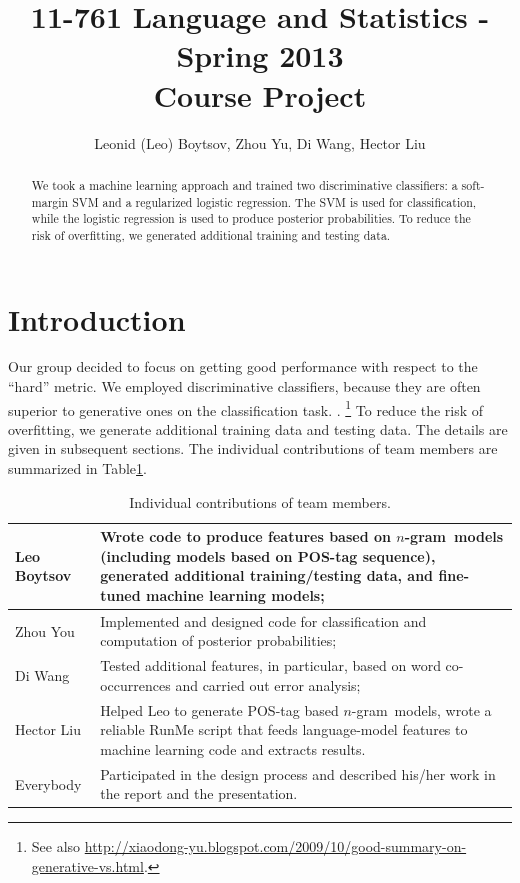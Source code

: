 \documentclass[11pt]{article}
\newcommand{\ngram}{\mbox{$n$-gram }}
\newcommand{\leocomment}[1]{\todo[color=red!40,caption={Leo's comment}]{#1}}
\begin{document}
\title{11-761 Language and Statistics - Spring 2013\\
Course Project}
\author{Leonid (Leo) Boytsov, Zhou Yu, Di Wang, Hector Liu}
\date{}
\maketitle

\begin{abstract}
We took a machine learning approach and trained two discriminative classifiers: 
a soft-margin SVM and a regularized logistic regression.
The SVM is used for classification, while the logistic regression is used to produce posterior probabilities.
To reduce the risk of overfitting, we generated additional training and testing data.
\end{abstract}


\section{Introduction}
Our group decided to focus on getting good performance with respect to the ``hard'' metric.
We employed discriminative classifiers, 
because they are often superior to generative ones on the classification task. \leocomment{I have simplified here.}\cite{roni2013,bishop2007generative}.
\footnote{See also \url{http://xiaodong-yu.blogspot.com/2009/10/good-summary-on-generative-vs.html}.}
To reduce the risk of overfitting, we generate additional training data and testing data.
The details are given in subsequent sections. The individual contributions of team members are summarized in Table\ref{TableContrib}.


\leocomment{Please, revise.}
\begin{table}[H]
\begin{tabular}{p{1in}|p{5in}}
\hline
Leo Boytsov &  Wrote code to produce features based on \ngram models (including models based on POS-tag sequence), generated additional training/testing data, and fine-tuned machine learning models;
\\\hline
Zhou You & Implemented and designed code for classification and computation of posterior probabilities;
\\\hline
Di Wang & Tested additional features, in particular, based on word co-occurrences and
carried out error analysis;
\\\hline
Hector Liu & Helped Leo to generate POS-tag based \ngram models, wrote a 
reliable RunMe script that feeds language-model features to machine learning code
and extracts results.
\\\hline
Everybody & Participated in the design process and described his/her work
in the report and the presentation.
\\\hline
\end{tabular}

\caption{\label{TableContrib}Individual contributions of team members.}
\end{table}
\end{document}
